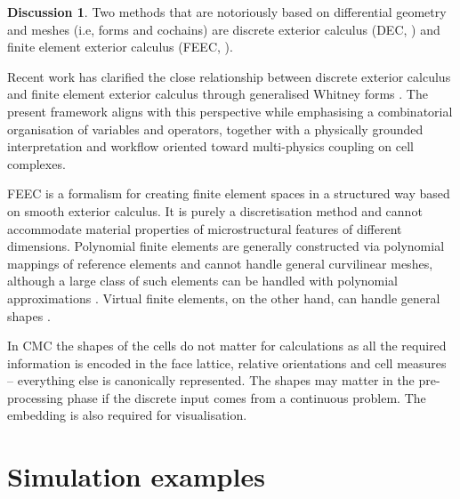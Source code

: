 \documentclass{elsarticle}
\theoremstyle{definition}
\newtheorem{discussion}[theorem]{Discussion}
\begin{document}
\begin{discussion}
  Two methods that are notoriously based on differential geometry and meshes (i.e, forms and cochains) are discrete exterior calculus (DEC, \cite{hirani2003discrete}) and finite element exterior calculus (FEEC, \cite{arnold2018finite}).

  Recent work has clarified the close relationship between discrete exterior
  calculus and finite element exterior calculus through generalised Whitney
  forms \cite{guzman2025framework}.
  The present framework aligns with this perspective while emphasising a
  combinatorial organisation of variables and operators, together with a
  physically grounded interpretation and workflow oriented toward multi-physics
  coupling on cell complexes.

  FEEC is a formalism for creating finite element spaces in a structured way based on smooth exterior calculus.
  It is purely a discretisation method and cannot accommodate material properties of microstructural features of different dimensions.
  Polynomial finite elements are generally constructed via polynomial mappings of reference elements and cannot handle general curvilinear meshes, although a large class of such elements can be handled with polynomial approximations \cite{botti2018assesment}.
  Virtual finite elements, on the other hand, can handle general shapes \cite{beirao2019virtual}.

  In CMC the shapes of the cells do not matter for calculations as all the required information is encoded in the face lattice, relative orientations and cell measures -- everything else is canonically represented.
  The shapes may matter in the pre-processing phase if the discrete input comes from a continuous problem.
  The embedding is also required for visualisation.
\end{discussion}

\section{Simulation examples}
\label{sec:simulations}
\end{document}

